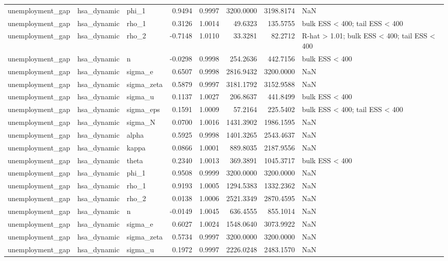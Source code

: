 \begin{tabular}{lllrrrrl}
unemployment\_gap & hsa\_dynamic & phi\_1 & 0.9494 & 0.9997 & 3200.0000 & 3198.8174 & NaN \\
unemployment\_gap & hsa\_dynamic & rho\_1 & 0.3126 & 1.0014 & 49.6323 & 135.5755 & bulk ESS < 400; tail ESS < 400 \\
unemployment\_gap & hsa\_dynamic & rho\_2 & -0.7148 & 1.0110 & 33.3281 & 82.2712 & R-hat > 1.01; bulk ESS < 400; tail ESS < 400 \\
unemployment\_gap & hsa\_dynamic & n & -0.0298 & 0.9998 & 254.2636 & 442.7156 & bulk ESS < 400 \\
unemployment\_gap & hsa\_dynamic & sigma\_e & 0.6507 & 0.9998 & 2816.9432 & 3200.0000 & NaN \\
unemployment\_gap & hsa\_dynamic & sigma\_zeta & 0.5879 & 0.9997 & 3181.1792 & 3152.9588 & NaN \\
unemployment\_gap & hsa\_dynamic & sigma\_u & 0.1137 & 1.0027 & 206.8637 & 441.8499 & bulk ESS < 400 \\
unemployment\_gap & hsa\_dynamic & sigma\_eps & 0.1591 & 1.0009 & 57.2164 & 225.5402 & bulk ESS < 400; tail ESS < 400 \\
unemployment\_gap & hsa\_dynamic & sigma\_N & 0.0700 & 1.0016 & 1431.3902 & 1986.1595 & NaN \\
unemployment\_gap & hsa\_dynamic & alpha & 0.5925 & 0.9998 & 1401.3265 & 2543.4637 & NaN \\
unemployment\_gap & hsa\_dynamic & kappa & 0.0866 & 1.0001 & 889.8035 & 2187.9556 & NaN \\
unemployment\_gap & hsa\_dynamic & theta & 0.2340 & 1.0013 & 369.3891 & 1045.3717 & bulk ESS < 400 \\
unemployment\_gap & hsa\_dynamic & phi\_1 & 0.9508 & 0.9999 & 3200.0000 & 3200.0000 & NaN \\
unemployment\_gap & hsa\_dynamic & rho\_1 & 0.9193 & 1.0005 & 1294.5383 & 1332.2362 & NaN \\
unemployment\_gap & hsa\_dynamic & rho\_2 & 0.0138 & 1.0006 & 2521.3349 & 2870.4595 & NaN \\
unemployment\_gap & hsa\_dynamic & n & -0.0149 & 1.0045 & 636.4555 & 855.1014 & NaN \\
unemployment\_gap & hsa\_dynamic & sigma\_e & 0.6027 & 1.0024 & 1548.0640 & 3073.9922 & NaN \\
unemployment\_gap & hsa\_dynamic & sigma\_zeta & 0.5734 & 0.9997 & 3200.0000 & 3200.0000 & NaN \\
unemployment\_gap & hsa\_dynamic & sigma\_u & 0.1972 & 0.9997 & 2226.0248 & 2483.1570 & NaN \\

\end{tabular}
